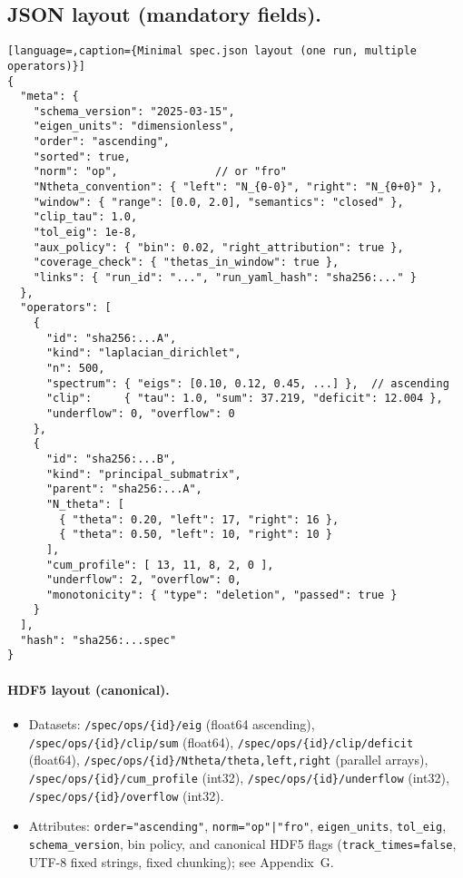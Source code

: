 \documentclass[11pt]{article}
\numberwithin{equation}{section}
\theoremstyle{plain}
\theoremstyle{definition}
\theoremstyle{remark}
\theoremstyle{plain}
\theoremstyle{definition}
\numberwithin{equation}{section}
\theoremstyle{definition}
\numberwithin{equation}{section}
\theoremstyle{plain}
\theoremstyle{definition}
\theoremstyle{remark}
\begin{document}
\subsection*{JSON layout (mandatory fields).}
\begin{lstlisting}[language=,caption={Minimal spec.json layout (one run, multiple operators)}]
{
  "meta": {
    "schema_version": "2025-03-15",
    "eigen_units": "dimensionless",
    "order": "ascending",
    "sorted": true,
    "norm": "op",               // or "fro"
    "Ntheta_convention": { "left": "N_{θ-0}", "right": "N_{θ+0}" },
    "window": { "range": [0.0, 2.0], "semantics": "closed" },
    "clip_tau": 1.0,
    "tol_eig": 1e-8,
    "aux_policy": { "bin": 0.02, "right_attribution": true },
    "coverage_check": { "thetas_in_window": true },
    "links": { "run_id": "...", "run_yaml_hash": "sha256:..." }
  },
  "operators": [
    {
      "id": "sha256:...A",
      "kind": "laplacian_dirichlet",
      "n": 500,
      "spectrum": { "eigs": [0.10, 0.12, 0.45, ...] },  // ascending
      "clip":     { "tau": 1.0, "sum": 37.219, "deficit": 12.004 },
      "underflow": 0, "overflow": 0
    },
    {
      "id": "sha256:...B",
      "kind": "principal_submatrix",
      "parent": "sha256:...A",
      "N_theta": [
        { "theta": 0.20, "left": 17, "right": 16 },
        { "theta": 0.50, "left": 10, "right": 10 }
      ],
      "cum_profile": [ 13, 11, 8, 2, 0 ],
      "underflow": 2, "overflow": 0,
      "monotonicity": { "type": "deletion", "passed": true }
    }
  ],
  "hash": "sha256:...spec"
}
\end{lstlisting}

\paragraph{HDF5 layout (canonical).}
\begin{itemize}[leftmargin=1.25em]
  \item Datasets:
  \texttt{/spec/ops/\{id\}/eig} (float64 ascending),
  \texttt{/spec/ops/\{id\}/clip/sum} (float64),
  \texttt{/spec/ops/\{id\}/clip/deficit} (float64),
  \texttt{/spec/ops/\{id\}/Ntheta/theta,left,right} (parallel arrays),
  \texttt{/spec/ops/\{id\}/cum\_profile} (int32),
  \texttt{/spec/ops/\{id\}/underflow} (int32),
  \texttt{/spec/ops/\{id\}/overflow} (int32).
  \item Attributes: \texttt{order="ascending"}, \texttt{norm="op"|"fro"}, \texttt{eigen\_units}, \texttt{tol\_eig}, \texttt{schema\_version}, bin policy, and canonical HDF5 flags (\texttt{track\_times=false}, UTF-8 fixed strings, fixed chunking); see Appendix~G.
\end{itemize}
\end{document}

